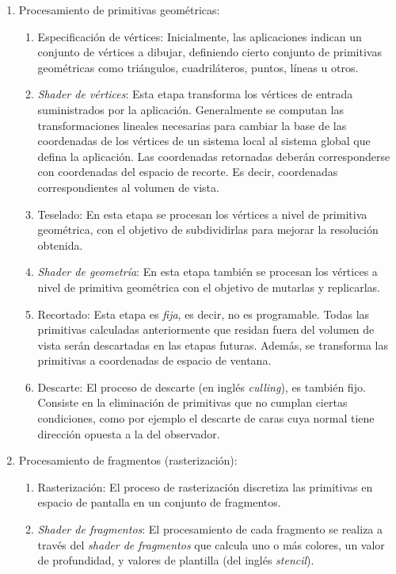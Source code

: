 \begin{enumerate}
	\item Procesamiento de primitivas geométricas:
		\begin{enumerate}
			\item Especificación de vértices: Inicialmente, las aplicaciones indican un conjunto de vértices a dibujar, definiendo cierto conjunto de primitivas geométricas como triángulos, cuadriláteros, puntos, líneas u otros.
			\item \textit{Shader de vértices}: Esta etapa transforma los vértices de entrada suministrados por la aplicación. Generalmente se computan las transformaciones lineales necesarias para cambiar la base de las coordenadas de los vértices de un sistema local al sistema global que defina la aplicación. Las coordenadas retornadas deberán corresponderse con coordenadas del espacio de recorte. Es decir, coordenadas correspondientes al volumen de vista.
			\item Teselado: En esta etapa se procesan los vértices a nivel de primitiva geométrica, con el objetivo de subdividirlas para mejorar la resolución obtenida.
			\item \textit{Shader de geometría}: En esta etapa también se procesan los vértices a nivel de primitiva geométrica con el objetivo de mutarlas y replicarlas.
			\item Recortado: Esta etapa es \textit{fija}, es decir, no es programable. Todas las primitivas calculadas anteriormente que residan fuera del volumen de vista serán descartadas en las etapas futuras. Además, se transforma las primitivas a coordenadas de espacio de ventana.
			\item Descarte: El proceso de descarte (en inglés \textit{culling}), es también fijo. Consiste en la eliminación de primitivas que no cumplan ciertas condiciones, como por ejemplo el descarte de caras cuya normal tiene dirección opuesta a la del observador.
		\end{enumerate}
	\item Procesamiento de fragmentos (rasterización):
		\begin{enumerate}
			\item Rasterización: El proceso de rasterización discretiza las primitivas en espacio de pantalla en un conjunto de fragmentos.
			\item \textit{Shader de fragmentos}: El procesamiento de cada fragmento se realiza a través del \textit{shader de fragmentos} que calcula uno o más colores, un valor de profundidad, y valores de plantilla (del inglés \textit{stencil}).

\end{enumerate}
\end{enumerate}
